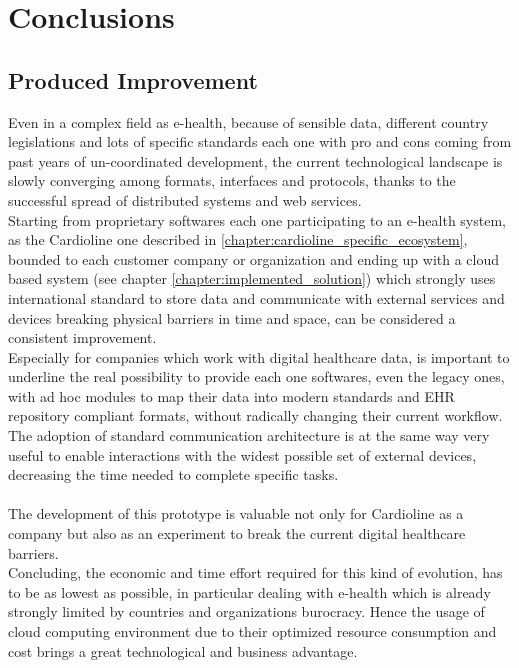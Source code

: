 \chapter{Conclusions}
\section{Produced Improvement}
Even in a complex field as e-health, because of sensible data, different country legislations and lots of specific standards each one with pro and cons coming from past years of un-coordinated development, the current technological landscape is slowly converging among formats, interfaces and protocols, thanks to the successful spread of distributed systems and web services.\\
Starting from proprietary softwares each one participating to an e-health system, as the Cardioline one described in \ref{chapter:cardioline_specific_ecosystem}, bounded to each customer company or organization and ending up with a cloud based system (see chapter \ref{chapter:implemented_solution}) which strongly uses international standard to store data and communicate with external services and devices breaking physical barriers in time and space, can be considered a consistent improvement.\\
Especially for companies which work with digital healthcare data, is important to underline the real possibility to provide each one softwares, even the legacy ones, with ad hoc modules to map their data into modern standards and EHR repository compliant formats, without radically changing their current workflow.
The adoption of standard communication architecture is at the same way very useful to enable interactions with the widest possible set of external devices, decreasing the time needed to complete specific tasks.\\ \\
The development of this prototype is valuable not only for Cardioline as a company but also as an experiment to break the current digital healthcare barriers.\\
Concluding, the economic and time effort required for this kind of evolution, has to be as lowest as possible, in particular dealing with e-health which is already strongly limited by countries and organizations burocracy. Hence the usage of cloud computing environment due to their optimized resource consumption and cost brings a great technological and business advantage.

